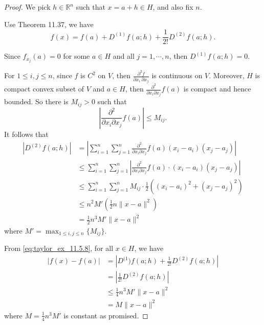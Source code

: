 \begin{Exercise}
\begin{proof}
We pick $h\in\mathbb{R}^n$ such that $x=a+h\in H$, and also fix $n$.

Use Theorem 11.37, we have
\begin{equation}
f(x)=f(a)+D^{(1)}f(a;h)+\frac{1}{2!}D^{(2)}f(a;h). \label{eq:taylor_ex_11.5.8}
\end{equation}

Since $f_{x_j}(a) = 0$ for some $a\in H$ and all $j=1,\cdots, n$, then $D^{(1)}f(a;h)=0$.

For $1\leq i,j \leq n$, since $f$ is $C^2$ on $V$, then $\frac{\partial^2 f}{\partial x_i\ \partial x_j}$ is continuous on $V$. Moreover, $H$ is compact convex subset of $V$ and $a\in H$, then $\frac{\partial^2}{\partial x_i \partial x_j} f(a)$ is compact and hence bounded. So there is $M_{i j}>0$ such that
$$
\left| \frac{\partial^2}{\partial x_i \partial x_j} f(a) \right |\leq M_{i j}.
$$
It follows that
\begin{align*}
\left| D^{(2)}f(a;h) \right|
&= \left| \sum_{i=1}^{n}\sum_{j=1}^{n} \frac{\partial^2}{\partial x_i \partial x_j} f(a)(x_i-a_i)(x_j-a_j) \right| \\
&\leq \sum_{i=1}^{n}\sum_{j=1}^{n} \left| \frac{\partial^2}{\partial x_i \partial x_j} f(a)\cdot(x_i-a_i)(x_j-a_j) \right| \\
&\leq \sum_{i=1}^{n}\sum_{j=1}^{n} M_{i j}\cdot\frac{1}{2} \left( (x_i-a_i)^2 + (x_j-a_j)^2 \right) \\
&\leq n^2 M' \left( \frac{1}{2} n \| x-a \|^2 \right) \\
&= \frac{1}{2}n^3 M'\|x-a\|^2
\end{align*}
where $M' = \max_{1\leq i,j\leq n}\{M_{i j}\}$.

From \eqref{eq:taylor_ex_11.5.8}, for all $x\in H$, we have
\begin{align*}
|f(x)-f(a)| 
&= \left|D^{(1})f(a;h)+\frac{1}{2!}D^{(2)}f(a;h) \right| \\
&= \left| \frac{1}{2!}D^{(2)}f(a;h) \right| \\
&\leq \frac{1}{4} n^3 M' \|x-a\|^2 \\
&= M\|x-a\|^2
\end{align*}
where $M=\frac{1}{4}n^3 M'$ is constant as promised.
\end{proof}
\end{Exercise}